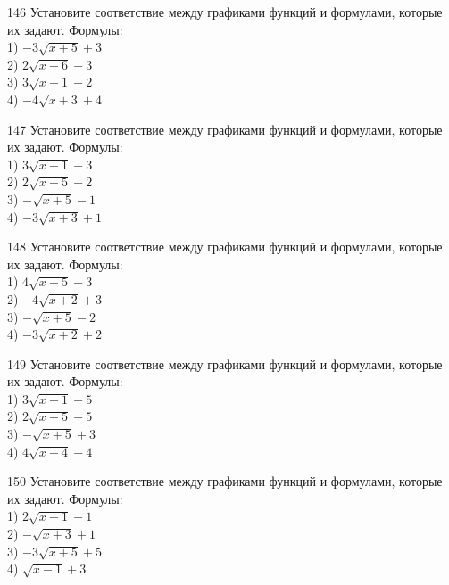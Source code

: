 \documentclass[4apaper]{article}
\begin{document}
\begin{taskBN}{146}
Установите соответствие между графиками функций и формулами, которые их задают. Формулы: \\1) $-3\sqrt{x+5}+3$\\2) $2\sqrt{x+6}-3$\\3) $3\sqrt{x+1}-2$\\4) $-4\sqrt{x+3}+4$
\end{taskBN}

\begin{taskBN}{147}
Установите соответствие между графиками функций и формулами, которые их задают. Формулы: \\1) $3\sqrt{x-1}-3$\\2) $2\sqrt{x+5}-2$\\3) $-\sqrt{x+5}-1$\\4) $-3\sqrt{x+3}+1$
\end{taskBN}

\begin{taskBN}{148}
Установите соответствие между графиками функций и формулами, которые их задают. Формулы: \\1) $4\sqrt{x+5}-3$\\2) $-4\sqrt{x+2}+3$\\3) $-\sqrt{x+5}-2$\\4) $-3\sqrt{x+2}+2$
\end{taskBN}

\begin{taskBN}{149}
Установите соответствие между графиками функций и формулами, которые их задают. Формулы: \\1) $3\sqrt{x-1}-5$\\2) $2\sqrt{x+5}-5$\\3) $-\sqrt{x+5}+3$\\4) $4\sqrt{x+4}-4$
\end{taskBN}

\begin{taskBN}{150}
Установите соответствие между графиками функций и формулами, которые их задают. Формулы: \\1) $2\sqrt{x-1}-1$\\2) $-\sqrt{x+3}+1$\\3) $-3\sqrt{x+5}+5$\\4) $\sqrt{x-1}+3$
\end{taskBN}
\end{document}
